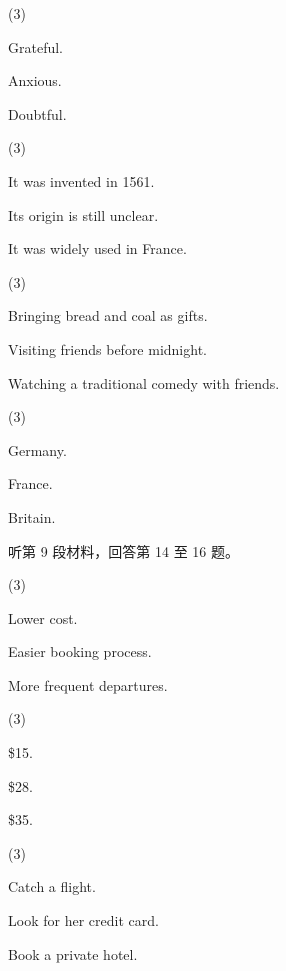 \documentclass{英语试卷}
\begin{document}
\begin{choices}(3)
  \item Grateful.
  \item Anxious.
  \item Doubtful.
\end{choices}
\begin{choices}(3)
  \item It was invented in 1561.
  \item Its origin is still unclear.
  \item It was widely used in France.
\end{choices}
\begin{choices}(3)
  \item Bringing bread and coal as gifts.
  \item Visiting friends before midnight.
  \item Watching a traditional comedy with friends.
\end{choices}
\begin{choices}(3)
  \item Germany.
  \item France.
  \item Britain.
\end{choices}
\par 听第 9 段材料，回答第 14 至 16 题。\par
{}
\begin{choices}(3)
  \item Lower cost.
  \item Easier booking process.
  \item More frequent departures.
\end{choices}
\begin{choices}(3)
  \item \$15.
  \item \$28.
  \item \$35.
\end{choices}
\begin{choices}(3)
  \item Catch a flight.
  \item Look for her credit card.
  \item Book a private hotel.
\end{choices}
\end{document}
